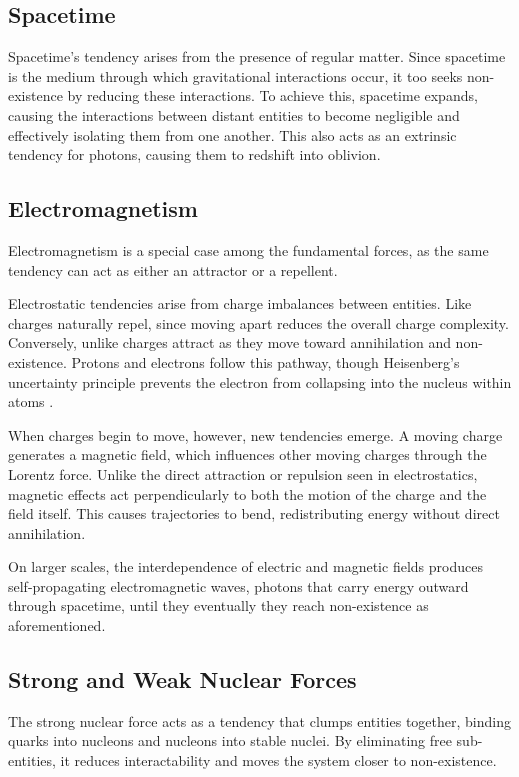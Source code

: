 \documentclass{article}
\begin{document}
\subsection{Spacetime}

Spacetime’s tendency arises from the presence of regular matter. 
Since spacetime is the medium through which gravitational interactions occur, it too seeks non-existence by reducing these interactions. 
To achieve this, spacetime expands, causing the interactions between distant entities 
to become negligible and effectively isolating them from one another.
This also acts as an extrinsic tendency for photons, causing them to redshift into oblivion.


\subsection{Electromagnetism}

Electromagnetism is a special case among the fundamental forces, as the same tendency can act as either an attractor or a repellent.

Electrostatic tendencies arise from charge imbalances between entities. 
Like charges naturally repel, since moving apart reduces the overall charge complexity. 
Conversely, unlike charges attract as they move toward annihilation and non-existence. 
Protons and electrons follow this pathway, though Heisenberg’s uncertainty principle prevents the electron from collapsing into the nucleus within atoms \cite{Heisenberg2007}.

When charges begin to move, however, new tendencies emerge. 
A moving charge generates a magnetic field, which influences other moving charges through the Lorentz force. 
Unlike the direct attraction or repulsion seen in electrostatics, magnetic effects act perpendicularly to both the motion of the charge and the field itself. 
This causes trajectories to bend, redistributing energy without direct annihilation. 

On larger scales, the interdependence of electric and magnetic fields produces self-propagating electromagnetic waves, photons that carry energy outward through spacetime, until they eventually they reach non-existence as aforementioned.


\subsection{Strong and Weak Nuclear Forces}

The strong nuclear force acts as a tendency that clumps entities together, binding quarks into nucleons and nucleons into stable nuclei. 
By eliminating free sub-entities, it reduces interactability and moves the system closer to non-existence. 
\end{document}
